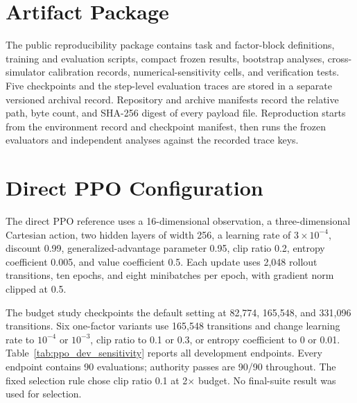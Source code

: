 \useRomanappendicesfalse
\appendices
\section{Artifact Package}
\label{app:artifact_package}

The public reproducibility package contains task and factor-block definitions,
training and evaluation scripts, compact frozen results, bootstrap analyses,
cross-simulator calibration records, numerical-sensitivity cells, and
verification tests. Five checkpoints and the step-level evaluation traces are
stored in a separate versioned archival record. Repository and archive
manifests record the relative path, byte count, and SHA-256 digest of every
payload file. Reproduction starts from the environment record and checkpoint
manifest, then runs the frozen evaluators and independent analyses against the
recorded trace keys.

\section{Direct PPO Configuration}
\label{app:ppo_configuration}

The direct PPO reference uses a 16-dimensional observation, a
three-dimensional Cartesian action, two hidden layers of width 256, a
learning rate of $3\times10^{-4}$, discount 0.99, generalized-advantage
parameter 0.95, clip ratio 0.2, entropy coefficient 0.005, and value
coefficient 0.5. Each update uses 2,048 rollout transitions, ten epochs, and
eight minibatches per epoch, with gradient norm clipped at 0.5.

The budget study checkpoints the default setting at 82,774, 165,548, and
331,096 transitions. Six one-factor variants use 165,548 transitions and
change learning rate to $10^{-4}$ or $10^{-3}$, clip ratio to 0.1 or 0.3, or
entropy coefficient to 0 or 0.01. Table~\ref{tab:ppo_dev_sensitivity} reports
all development endpoints. Every endpoint contains 90 evaluations; authority
passes are 90/90 throughout. The fixed selection rule chose clip ratio 0.1 at
2$\times$ budget. No final-suite result was used for selection.

